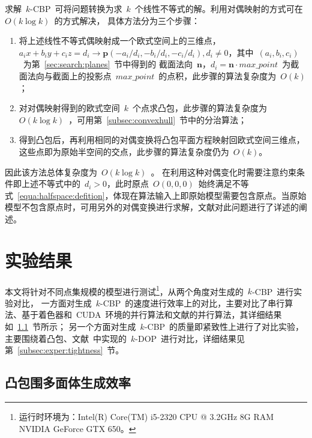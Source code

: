 求解~$k$-CBP~可将问题转换为求~$k$~个线性不等式的解。利用对偶映射的方式可在~$O(k \log k)$~的方式解决，
具体方法分为三个步骤\cite{Preparata1985Introduction}：
\begin{enumerate}[(1)]
\item   
将上述线性不等式偶映射成一个欧式空间上的三维点，
$a_ix+b_iy+c_iz=d_i \rightarrow \bm{p}(-a_i/d_i, -b_i/d_i,-c_i/d_i),d_i \neq 0$，其中~$(a_i,b_i,c_i)$~为第~\ref{sec:search:planes}~节中得到的
截面法向~$\bm{n}$，$d_i=\bm{n} \cdot
max\_point$~为截面法向与截面上的投影点~$max\_point$~的点积，此步骤的算法复杂度为~$O(k)$；
\item
  对对偶映射得到的欧式空间~$k$~个点求凸包，此步骤的算法复杂度为~$O(k\log k)$~，可用第~\ref{subsec:convexhull}~节中的分治算法；
\item
  得到凸包后，再利用相同的对偶变换将凸包平面方程映射回欧式空间三维点，这些点即为原始半空间的交点，此步骤的算法复杂度仍为~$O(k)$。
\end{enumerate}

因此该方法总体复杂度为~$O(k\log k)$~。
在利用这种对偶变化时需要注意约束条件即上述不等式中的~$d_i>0$，此时原点~$O(0,0,0)$~始终满足不等式~\ref{equa:halfspace:defition}，体现在算法输入上即原始模型需要包含原点。当原始模型不包含原点时，可用另外的对偶变换进行求解，文献对此问题进行了详述的阐述。

\section{实验结果}
\label{sec:exper-kcbp}

本文将针对不同点集规模的模型进行测试\footnote{运行时环境为：Intel(R) Core(TM)
i5-2320 CPU @ 3.2GHz 8G RAM NVIDIA GeForce GTX
650。}，从两个角度对生成的~$k$-CBP~进行实验对比，
一方面对生成~$k$-CBP~的速度进行效率上的对比，主要对比了串行算法、基于着色器和~CUDA~环境的并行算法和文献的并行算法，其详细结果如~\ref{subsec:exper:efficiency}~节所示；
另一个方面对生成~$k$-CBP~的质量即紧致性上进行了对比实验，主要围绕着凸包、文献~中实现的~$k$-DOP~进行对比，详细结果见第~\ref{subsec:exper:tightness}~节。

\subsection{凸包围多面体生成效率}
\label{subsec:exper:efficiency}

